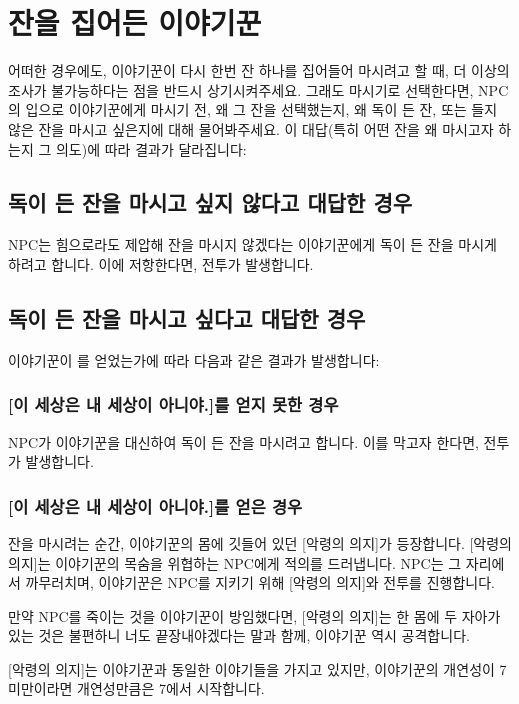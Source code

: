 \documentclass{report}
\begin{document}
	\section{잔을 집어든 이야기꾼}
	
	어떠한 경우에도, 이야기꾼이 다시 한번 잔 하나를 집어들어 마시려고 할 때, 더 이상의 조사가 불가능하다는 점을 반드시 상기시켜주세요. 그래도 마시기로 선택한다면, NPC의 입으로 이야기꾼에게 마시기 전, 왜 그 잔을 선택했는지, 왜 독이 든 잔, 또는 들지 않은 잔을 마시고 싶은지에 대해 물어봐주세요. 이 대답(특히 어떤 잔을 왜 마시고자 하는지 그 의도)에 따라 결과가 달라집니다:
	
	\subsection{독이 든 잔을 마시고 싶지 않다고 대답한 경우}
		NPC는 힘으로라도 제압해 잔을 마시지 않겠다는 이야기꾼에게 독이 든 잔을 마시게 하려고 합니다. 이에 저항한다면, 전투가 발생합니다.
	
	\subsection{독이 든 잔을 마시고 싶다고 대답한 경우}
		이야기꾼이 를 얻었는가에 따라 다음과 같은 결과가 발생합니다:
		
		\subsubsection{[이 세상은 내 세상이 아니야.]를 얻지 못한 경우}
			NPC가 이야기꾼을 대신하여 독이 든 잔을 마시려고 합니다. 이를 막고자 한다면, 전투가 발생합니다.
	
		\subsubsection{[이 세상은 내 세상이 아니야.]를 얻은 경우}
			잔을 마시려는 순간, 이야기꾼의 몸에 깃들어 있던 [악령의 의지]가 등장합니다. [악령의 의지]는 이야기꾼의 목숨을 위협하는 NPC에게 적의를 드러냅니다. NPC는 그 자리에서 까무러치며, 이야기꾼은 NPC를 지키기 위해 [악령의 의지]와 전투를 진행합니다.
			
			만약 NPC를 죽이는 것을 이야기꾼이 방임했다면, [악령의 의지]는 한 몸에 두 자아가 있는 것은 불편하니 너도 끝장내야겠다는 말과 함께, 이야기꾼 역시 공격합니다.
			
			[악령의 의지]는 이야기꾼과 동일한 이야기들을 가지고 있지만, 이야기꾼의 개연성이 7 미만이라면 개연성만큼은 7에서 시작합니다.
	
\end{document}
